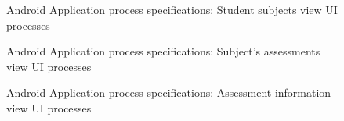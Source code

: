 \begin{figure}[H]
\centering	
{}
\caption{Android Application process specifications: Student subjects view UI processes}
\end{figure}

\begin{figure}[H]
\centering	
{}
\caption{Android Application process specifications: Subject's assessments view UI processes}
\end{figure}

\begin{figure}[H]
\centering	
{}
\caption{Android Application process specifications: Assessment information view UI processes}
\end{figure}

